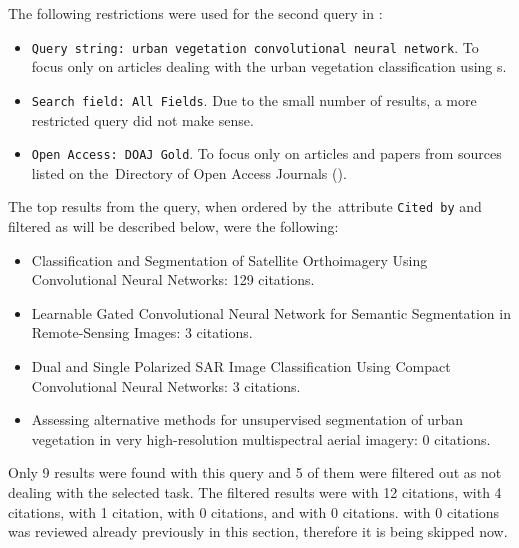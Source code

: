 
The following restrictions were used for the second query in :

\begin{itemize}
	\item \verb|Query string: urban vegetation convolutional neural network|. To focus only on articles dealing with the urban vegetation classification using s.
	\item \verb|Search field: All Fields|. Due to the small number of results, a more restricted query did not make sense.
	\item \verb|Open Access: DOAJ Gold|. To focus only on articles and papers from sources listed on the~Di\-rectory of Open Access Journals ().
\end{itemize}

\noindent The top results from the query, when ordered by the~attribute \verb|Cited by| and filtered as will be described below, were the following:

\begin{itemize}
	\item Classification and Segmentation of Satellite Orthoimagery Using Convolutional Neural Networks: 129 citations. \cite{cnn-satellite-orthoimagery}
	\item Learnable Gated Convolutional Neural Network for Semantic Segmentation in Remote-Sensing Images: 3 citations. \cite{gated-cnn-rs}
	\item Dual and Single Polarized SAR Image Classification Using Compact Convolutional Neural Networks: 3 citations. \cite{polarized-sar-cnn}
	\item Assessing alternative methods for unsupervised segmentation of urban vegetation in very high-resolution multispectral aerial imagery: 0 citations. \cite{urban-green-unsupervised-aerial}
\end{itemize}

\noindent Only 9 results were found with this query and 5 of them were filtered out as not dealing with the selected task. The filtered results were \cite{urban-green-trees-worldview} with 12 citations, \cite{cnn-urban-aerial} with 4 citations, \cite{urban-green-quantification} with 1 citation, \cite{dl-vegetation} with 0 citations, and \cite{tibet-ice-ml} with 0 citations. \cite{urban-green-unsupervised-aerial} with 0 citations was reviewed already previously in this section, therefore it is being skipped now.

